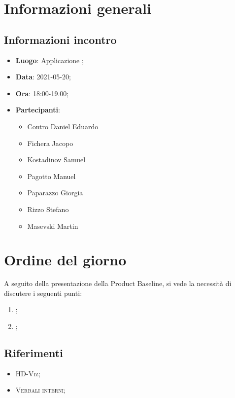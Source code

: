 \documentclass{article}
\begin{document}


\section{Informazioni generali}
\label{sec:info_generali}

\subsection{Informazioni incontro}
\label{sub:info_incontro}

\begin{itemize}
	\item \textbf{Luogo}: Applicazione ;
	\item \textbf{Data}: 2021-05-20;
	\item \textbf{Ora}: 18:00-19.00;
	\item \textbf{Partecipanti}:
	\begin{itemize}
		\item Contro Daniel Eduardo
		\item Fichera Jacopo
		\item Kostadinov Samuel
        \item Pagotto Manuel
		\item Paparazzo Giorgia
		\item Rizzo Stefano
		\item Masevski Martin
	\end{itemize}
\end{itemize}

\section{Ordine del giorno}%
\label{sec:ordine_del_giorno}
A seguito della presentazione della Product Baseline, si vede la necessità di discutere i seguenti punti:
\begin{enumerate}
	\item {};
	\item {};
\end{enumerate}


\subsection{Riferimenti}%
\label{sub:riferimenti}
\begin{itemize}
    \item \textsc{HD-Viz};
    \item \textsc{Verbali interni};
    \end{itemize}
\end{document}
